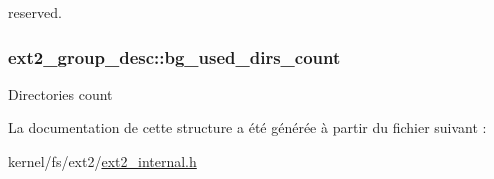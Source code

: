 reserved. \hypertarget{structext2__group__desc_adc9924671cb04dd63b4b7ffff8c262dc}{
\subsubsection[{bg\+\_\+used\+\_\+dirs\+\_\+count}]{ ext2\+\_\+group\+\_\+desc\+::bg\+\_\+used\+\_\+dirs\+\_\+count}}\label{structext2__group__desc_adc9924671cb04dd63b4b7ffff8c262dc}
Directories count 

La documentation de cette structure a été générée à partir du fichier suivant \+:\begin{DoxyCompactItemize}
\item 
kernel/fs/ext2/\hyperlink{ext2__internal_8h}{ext2\+\_\+internal.\+h}\end{DoxyCompactItemize}
